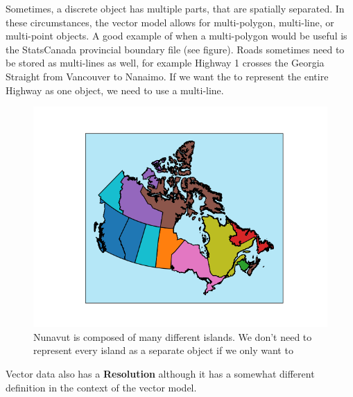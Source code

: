 \documentclass[
]{book}
\begin{document}
Sometimes, a discrete object has multiple parts, that are spatially separated. In these circumstances, the vector model allows for multi-polygon, multi-line, or multi-point objects. A good example of when a multi-polygon would be useful is the StatsCanada provincial boundary file (see figure). Roads sometimes need to be stored as multi-lines as well, for example Highway 1 crosses the Georgia Straight from Vancouver to Nanaimo. If we want the to represent the entire Highway as one object, we need to use a multi-line.

\begin{figure}
\centering
\includegraphics{images/03-multi-polygon.png}
\caption{Nunavut is composed of many different islands. We don't need to represent every island as a separate object if we only want to}
\end{figure}

Vector data also has a \textbf{Resolution} although it has a somewhat different definition in the context of the vector model.
\end{document}
